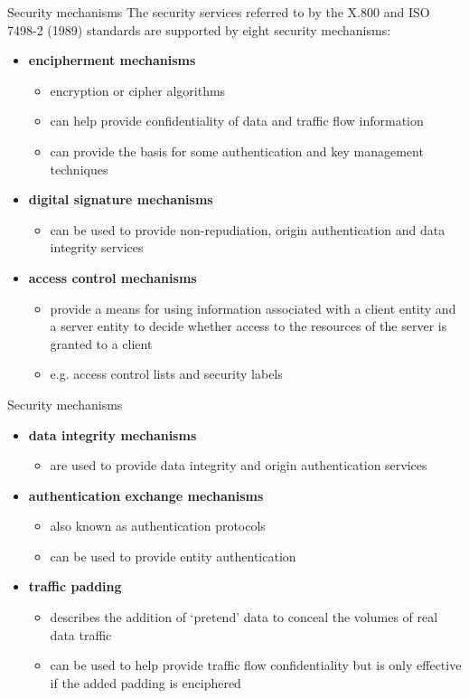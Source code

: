 \documentclass[pdf]{beamer}
\begin{document}
\begin{frame}{Security mechanisms}
The security services referred to by the X.800 and ISO 7498-2 (1989) standards are supported by eight security mechanisms:
\begin{itemize}
\item
\textbf{encipherment mechanisms}
\begin{itemize}
\item
encryption or cipher algorithms
\item
can help provide confidentiality of data and traffic flow information
\item
can provide the basis for some authentication and key management techniques
\end{itemize}
\item
\textbf{digital signature mechanisms}
\begin{itemize}
\item
can be used to provide non-repudiation, origin authentication and data integrity services
\end{itemize}
\item
\textbf{access control mechanisms}
\begin{itemize}
\item
provide a means for using information associated with a client entity and a server entity to decide whether access to the resources of the server is granted to a client
\item
e.g. access control lists and security labels
\end{itemize}
\end{itemize}
\end{frame}



\begin{frame}{Security mechanisms}
\begin{itemize}
\item
\textbf{data integrity mechanisms}
\begin{itemize}
\item
are used to provide data integrity and origin authentication services
\end{itemize}
\item
\textbf{authentication exchange mechanisms}
\begin{itemize}
\item
also known as authentication protocols
\item
can be used to provide entity authentication
\end{itemize} 
\item
\textbf{traffic padding}
\begin{itemize}
\item
describes the addition of ‘pretend’ data to conceal the volumes
of real data traffic
\item
can be used to help provide traffic flow confidentiality but
is only effective if the added padding is enciphered
\end{itemize}
\end{itemize}
\end{frame}
\end{document}
